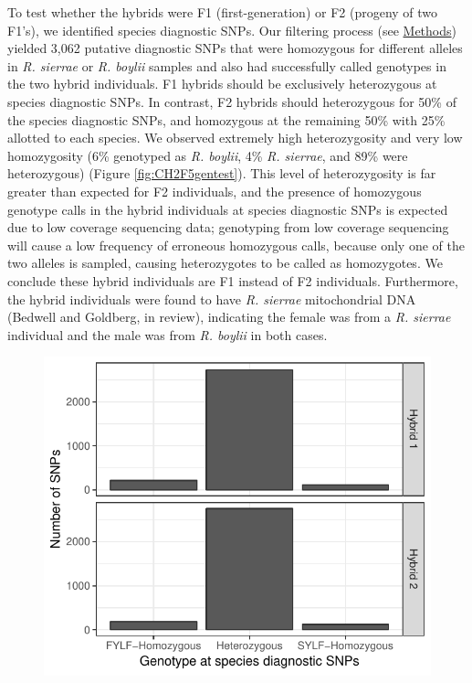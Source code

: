\documentclass[proquest,12pt,final]{ucthesis-CA2012} %
\begin{document}
\begin{ucmainmatter}
To test whether the hybrids were F1 (first-generation) or F2 (progeny of
two F1's), we identified species diagnostic SNPs. Our filtering process
(see \protect\hyperlink{f1vsf2}{Methods}) yielded 3,062 putative
diagnostic SNPs that were homozygous for different alleles in \emph{R.
sierrae} or \emph{R. boylii} samples and also had successfully called
genotypes in the two hybrid individuals. F1 hybrids should be
exclusively heterozygous at species diagnostic SNPs. In contrast, F2
hybrids should heterozygous for 50\% of the species diagnostic SNPs, and
homozygous at the remaining 50\% with 25\% allotted to each species. We
observed extremely high heterozygosity and very low homozygosity (6\%
genotyped as \emph{R. boylii}, 4\% \emph{R. sierrae}, and 89\% were
heterozygous) (Figure \ref{fig:CH2F5gentest}). This level of
heterozygosity is far greater than expected for F2 individuals, and the
presence of homozygous genotype calls in the hybrid individuals at
species diagnostic SNPs is expected due to low coverage sequencing data;
genotyping from low coverage sequencing will cause a low frequency of
erroneous homozygous calls, because only one of the two alleles is
sampled, causing heterozygotes to be called as homozygotes. We conclude
these hybrid individuals are F1 instead of F2 individuals. Furthermore,
the hybrid individuals were found to have \emph{R. sierrae}
mitochondrial DNA (Bedwell and Goldberg, in review), indicating the
female was from a \emph{R. sierrae} individual and the male was from
\emph{R. boylii} in both cases.




\begin{figure}

{\centering \includegraphics[width=1\linewidth]{figure/ch2/figure_05_f1_f2_hybrid_test_faceted} 

}
\end{figure}
\end{ucmainmatter}
\end{document}
